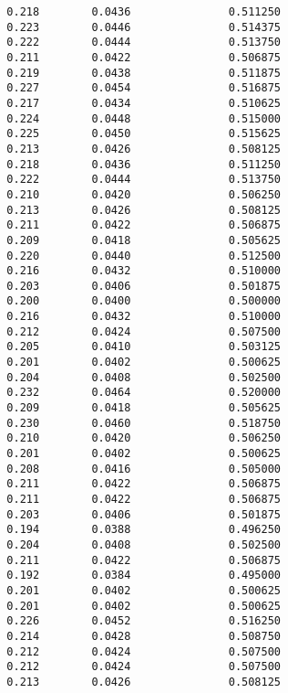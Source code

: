 \documentclass[
  letterpaper,
  DIV=11,
  numbers=noendperiod]{scrartcl}
\begin{document}
\begin{verbatim}
  0.218        0.0436               0.511250              
  0.223        0.0446               0.514375              
  0.222        0.0444               0.513750              
  0.211        0.0422               0.506875              
  0.219        0.0438               0.511875              
  0.227        0.0454               0.516875              
  0.217        0.0434               0.510625              
  0.224        0.0448               0.515000              
  0.225        0.0450               0.515625              
  0.213        0.0426               0.508125              
  0.218        0.0436               0.511250              
  0.222        0.0444               0.513750              
  0.210        0.0420               0.506250              
  0.213        0.0426               0.508125              
  0.211        0.0422               0.506875              
  0.209        0.0418               0.505625              
  0.220        0.0440               0.512500              
  0.216        0.0432               0.510000              
  0.203        0.0406               0.501875              
  0.200        0.0400               0.500000              
  0.216        0.0432               0.510000              
  0.212        0.0424               0.507500              
  0.205        0.0410               0.503125              
  0.201        0.0402               0.500625              
  0.204        0.0408               0.502500              
  0.232        0.0464               0.520000              
  0.209        0.0418               0.505625              
  0.230        0.0460               0.518750              
  0.210        0.0420               0.506250              
  0.201        0.0402               0.500625              
  0.208        0.0416               0.505000              
  0.211        0.0422               0.506875              
  0.211        0.0422               0.506875              
  0.203        0.0406               0.501875              
  0.194        0.0388               0.496250              
  0.204        0.0408               0.502500              
  0.211        0.0422               0.506875              
  0.192        0.0384               0.495000              
  0.201        0.0402               0.500625              
  0.201        0.0402               0.500625              
  0.226        0.0452               0.516250              
  0.214        0.0428               0.508750              
  0.212        0.0424               0.507500              
  0.212        0.0424               0.507500              
  0.213        0.0426               0.508125              

\end{verbatim}
\end{document}
